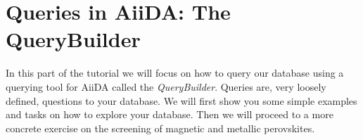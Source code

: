 
\section{Queries in AiiDA: The QueryBuilder}
\label{sec:querybuilder}
In this part of the tutorial we will focus on how to query our database using a querying tool for AiiDA called the \textit{QueryBuilder}.
Queries are, very loosely defined, questions to your database.
We will first show you some simple examples and tasks on how to explore your database.
Then we will proceed to a more concrete exercise on the screening of magnetic and metallic perovskites.\\




%





